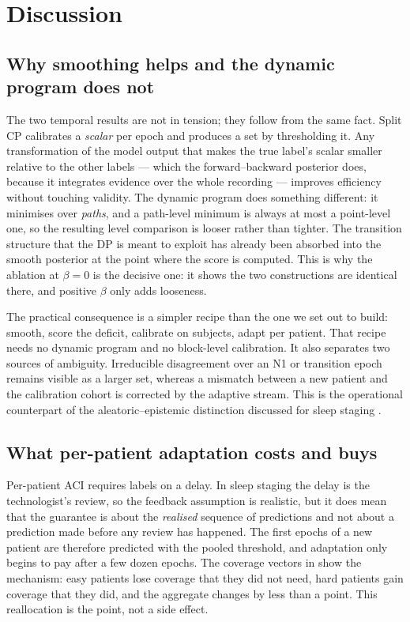 \section{Discussion}
\label{sec:discussion}

\subsection{Why smoothing helps and the dynamic program does not}
\label{sec:disc-why}

The two temporal results are not in tension; they follow from the same fact.
Split CP calibrates a \emph{scalar} per epoch and produces a set by
thresholding it. Any transformation of the model output that makes the true
label's scalar smaller relative to the other labels --- which the
forward--backward posterior does, because it integrates evidence over the
whole recording --- improves efficiency without touching validity. The
dynamic program does something different: it minimises over \emph{paths}, and
a path-level minimum is always at most a point-level one, so the resulting
level comparison is looser rather than tighter. The transition structure that
the DP is meant to exploit has already been absorbed into the smooth posterior
at the point where the score is computed. This is why the ablation at $\beta=0$
is the decisive one: it shows the two constructions are identical there, and
positive $\beta$ only adds looseness.

The practical consequence is a simpler recipe than the one we set out to
build: smooth, score the deficit, calibrate on subjects, adapt per patient.
That recipe needs no dynamic program and no block-level calibration.
It also separates two sources of ambiguity. Irreducible disagreement over an
N1 or transition epoch remains visible as a larger set, whereas a mismatch
between a new patient and the calibration cohort is corrected by the adaptive
stream. This is the operational counterpart of the aleatoric--epistemic
distinction discussed for sleep staging \citep{vangorp2022certainty}.

\subsection{What per-patient adaptation costs and buys}
\label{sec:disc-aci}

Per-patient ACI requires labels on a delay. In sleep staging the delay is the
technologist's review, so the feedback assumption is realistic, but it does
mean that the guarantee is about the \emph{realised} sequence of predictions
and not about a prediction made before any review has happened. The first
epochs of a new patient are therefore predicted with the pooled threshold,
and adaptation only begins to pay after a few dozen epochs. The coverage
vectors in  show the mechanism: easy patients lose
coverage that they did not need, hard patients gain coverage that they did,
and the aggregate changes by less than a point. This reallocation is the
point, not a side effect.

